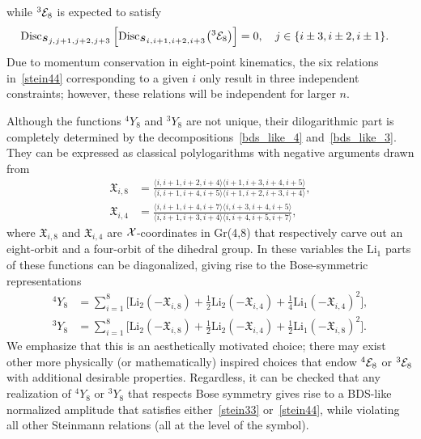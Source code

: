 \documentclass[11pt]{article}
\def\mand#1{\scaleto{s}{4.6pt}_{\scaleto{#1}{5.2pt}}}
\begin{document}
while ${}^3 {\cal E}_8$ is expected to satisfy
\begin{equation}
\begin{split}
\text{Disc}_{\mand{j,j+1,j+2,j+3}}\left[\text{Disc}_{\mand{i,i+1,i+2,i+3}} \big({}^3 {\cal E}_8 \big) \right] &= 0, \quad j \in \{ i \pm 3, i \pm 2, i \pm 1 \}.  \label{stein44}
\end{split}
\end{equation}
Due to momentum conservation in eight-point kinematics, the six relations in~\eqref{stein44} corresponding to a given $i$ only result in three independent constraints; however, these relations will be independent for larger $n$.

Although the functions ${}^4 Y_{8}$ and ${}^3 Y_{8}$ are not unique, their dilogarithmic part is completely determined by the decompositions~\eqref{bds_like_4} and~\eqref{bds_like_3}. They can be expressed as classical polylogarithms with negative arguments drawn from \begin{align}
\mathfrak{X}_{i,8} &= \frac{\langle i,i+1,i+2,i+4 \rangle \langle i+1,i+3,i+4,i+5\rangle}{\langle i,i+1,i+4,i+5 \rangle \langle i+1,i+2,i+3,i+4 \rangle}, \\
\mathfrak{X}_{i,4} &= \frac{\langle i,i+1,i+4,i+7 \rangle \langle i,i+3,i+4,i+5 \rangle}{\langle i,i+1,i+3,i+4 \rangle \langle i,i+4,i+5,i+7 \rangle},
\end{align}
where $\mathfrak{X}_{i,8}$ and $\mathfrak{X}_{i,4}$ are ${\cal X}$-coordinates in Gr(4,8) that respectively carve out an eight-orbit and a four-orbit of the dihedral group. In these variables the $\text{Li}_1$ parts of these functions can be diagonalized, giving rise to the Bose-symmetric representations
\begin{align}
{}^4 Y_8 &= \sum_{i=1}^8 \bigg[ \text{Li}_2 \left( - \mathfrak{X}_{i,8} \right) + \frac12 \text{Li}_2 \left(- \mathfrak{X}_{i,4}  \right) + \frac14 \text{Li}_1\left(- \mathfrak{X}_{i,4} \right)^2 \bigg], \\
{}^3 Y_8 &= \sum_{i=1}^8 \bigg[ \text{Li}_2 \left( - \mathfrak{X}_{i,8} \right) + \frac12 \text{Li}_2 \left(- \mathfrak{X}_{i,4}  \right) + \frac12 \text{Li}_1\left(- \mathfrak{X}_{i,8} \right)^2 \bigg].
\end{align}
We emphasize that this is an aesthetically motivated choice; there may exist other more physically (or mathematically) inspired choices that endow ${}^4 {\cal E}_8$ or ${}^3 {\cal E}_8$ with additional desirable properties. Regardless, it can be checked that any realization of ${}^4 Y_8$ or ${}^3 Y_8$ that respects Bose symmetry gives rise to a BDS-like normalized amplitude that satisfies either~\eqref{stein33} or~\eqref{stein44}, while violating all other Steinmann relations (all at the level of the symbol). 
\end{document}

